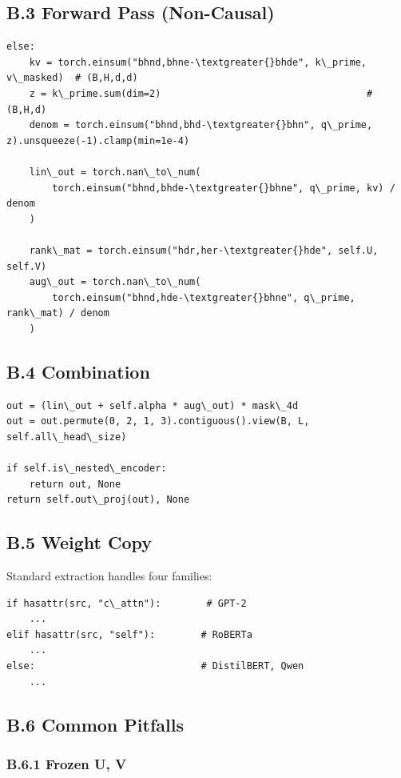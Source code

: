 \subsection{B.3 Forward Pass (Non-Causal)}

\begin{lstlisting}
else:
    kv = torch.einsum("bhnd,bhne-\textgreater{}bhde", k\_prime, v\_masked)  # (B,H,d,d)
    z = k\_prime.sum(dim=2)                                    # (B,H,d)
    denom = torch.einsum("bhnd,bhd-\textgreater{}bhn", q\_prime, z).unsqueeze(-1).clamp(min=1e-4)
    
    lin\_out = torch.nan\_to\_num(
        torch.einsum("bhnd,bhde-\textgreater{}bhne", q\_prime, kv) / denom
    )
    
    rank\_mat = torch.einsum("hdr,her-\textgreater{}hde", self.U, self.V)
    aug\_out = torch.nan\_to\_num(
        torch.einsum("bhnd,hde-\textgreater{}bhne", q\_prime, rank\_mat) / denom
    )
\end{lstlisting}

\subsection{B.4 Combination}

\begin{lstlisting}
out = (lin\_out + self.alpha * aug\_out) * mask\_4d
out = out.permute(0, 2, 1, 3).contiguous().view(B, L, self.all\_head\_size)

if self.is\_nested\_encoder:
    return out, None
return self.out\_proj(out), None
\end{lstlisting}

\subsection{B.5 Weight Copy}

Standard extraction handles four families:

\begin{lstlisting}
if hasattr(src, "c\_attn"):        # GPT-2
    ...
elif hasattr(src, "self"):        # RoBERTa
    ...
else:                             # DistilBERT, Qwen
    ...
\end{lstlisting}

\subsection{B.6 Common Pitfalls}

\subsubsection{B.6.1 Frozen U, V}

